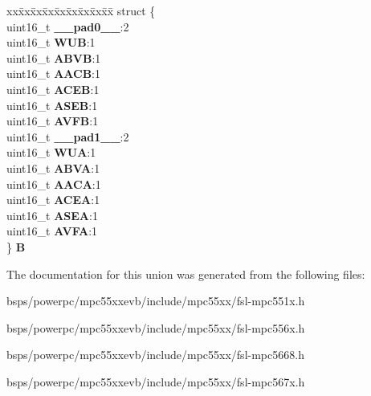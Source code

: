 \begin{DoxyCompactItemize}
\begin{tabbing}
\end{tabbing}\item 
\mbox{\label{unionuPSR3_a3fdada7dffb645f37fa0adae30f0c106}} 
\begin{tabbing}
xx\=xx\=xx\=xx\=xx\=xx\=xx\=xx\=xx\=\kill
struct \{\\
\>uint16\_t {\bfseries \_\_pad0\_\_}:2\\
\>uint16\_t {\bfseries WUB}:1\\
\>uint16\_t {\bfseries ABVB}:1\\
\>uint16\_t {\bfseries AACB}:1\\
\>uint16\_t {\bfseries ACEB}:1\\
\>uint16\_t {\bfseries ASEB}:1\\
\>uint16\_t {\bfseries AVFB}:1\\
\>uint16\_t {\bfseries \_\_pad1\_\_}:2\\
\>uint16\_t {\bfseries WUA}:1\\
\>uint16\_t {\bfseries ABVA}:1\\
\>uint16\_t {\bfseries AACA}:1\\
\>uint16\_t {\bfseries ACEA}:1\\
\>uint16\_t {\bfseries ASEA}:1\\
\>uint16\_t {\bfseries AVFA}:1\\
\} {\bfseries B}\\

\end{tabbing}\end{DoxyCompactItemize}


The documentation for this union was generated from the following files\+:\begin{DoxyCompactItemize}
\item 
bsps/powerpc/mpc55xxevb/include/mpc55xx/fsl-\/mpc551x.\+h\item 
bsps/powerpc/mpc55xxevb/include/mpc55xx/fsl-\/mpc556x.\+h\item 
bsps/powerpc/mpc55xxevb/include/mpc55xx/fsl-\/mpc5668.\+h\item 
bsps/powerpc/mpc55xxevb/include/mpc55xx/fsl-\/mpc567x.\+h\end{DoxyCompactItemize}
